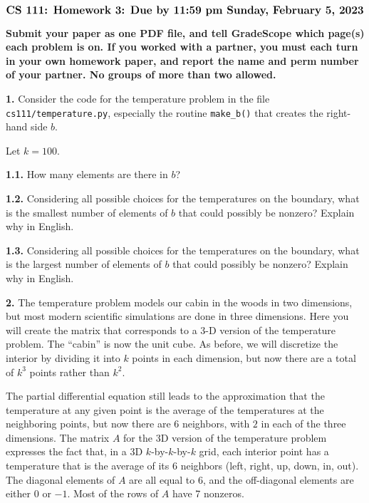 \documentclass[11pt]{article}
\begin{document}
$$\mbox{\Large \bf CS 111: Homework 3: Due by 11:59 pm Sunday, February 5, 2023}$$
\par\smallskip\noindent
{\bf Submit your paper as one PDF file,
and tell GradeScope which page(s) each problem is on.
If you worked with a partner, you must each turn in your own 
homework paper, and report the name and perm number of your partner.
No groups of more than two allowed.
}

\par\bigskip
{\bf 1.}
Consider the code for the temperature problem in 
the file {\tt cs111/temperature.py}, 
especially the routine {\tt make\_b()} that creates the right-hand side $b$.

Let $k=100$.

\par\medskip
{\bf 1.1.}
How many elements are there in $b$?

\par\medskip
{\bf 1.2.}
Considering all possible choices for the temperatures on the boundary,
what is the smallest number of elements of $b$ that could possibly 
be nonzero?  Explain why in English.

\par\medskip
{\bf 1.3.}
Considering all possible choices for the temperatures on the boundary,
what is the largest number of elements of $b$ that could possibly 
be nonzero?  Explain why in English.

\par\bigskip
{\bf 2.}
The temperature problem models our cabin in the woods in two dimensions,
but most modern scientific simulations are done in three dimensions.
Here you will create the matrix that corresponds to a 3-D version of 
the temperature problem. The ``cabin'' is now the unit cube. As before,
we will discretize the interior by dividing it into $k$ points in each
dimension, but now there are a total of $k^3$ points rather than $k^2$.

The partial differential equation still leads to the approximation
that the temperature at any given point is the average of the temperatures
at the neighboring points, but now there are 6 neighbors, 
with $2$ in each of the three dimensions.
The matrix $A$ for the 3D version of the temperature problem
expresses the fact that, in a 3D $k$-by-$k$-by-$k$ grid, 
each interior point has a temperature that is the average of its 6 neighbors 
(left, right, up, down, in, out).
The diagonal elements of $A$ are all equal to $6$, 
and the off-diagonal elements are either $0$ or $-1$.
Most of the rows of $A$ have 7 nonzeros.
\end{document}
